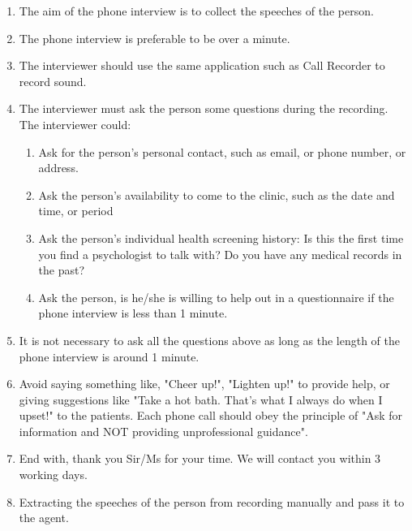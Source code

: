 \documentclass{article}
\begin{document}
       \begin{enumerate}
            \item The aim of the phone interview is to collect the speeches of the person.
            \item The phone interview is preferable to be over a minute.
        \item The interviewer should use the same application such as Call Recorder to record sound.
        \item The interviewer must ask the person some questions during the recording. The interviewer could: 
          \begin{enumerate}
              \item Ask for the person's personal contact, such as email, or phone number, or address.
              \item Ask the person's availability to come to the clinic, such as the date and time, or period
              \item Ask the person's individual health screening history: 
              Is this the first time you find a psychologist to talk with? Do you have any medical records in the past?
              \item Ask the person, is he/she is willing to help out in a questionnaire if the phone interview is less than 1 minute.
          \end{enumerate}
        \item It is not necessary to ask all the questions above as long as the length of the phone interview is around 1 minute.
        \item Avoid saying something like, "Cheer up!", "Lighten up!" to provide help, or giving suggestions like 
                "Take a hot bath. That's what I always do when I upset!" to the patients. 
                Each phone call should obey the principle of "Ask for information and NOT providing unprofessional guidance". \cite{PsychCentral2015}
        \item End with, thank you Sir/Ms for your time. We will contact you within 3 working days.
        \item Extracting the speeches of the person from recording manually and pass it to the agent.
    \end{enumerate}
\end{document}
